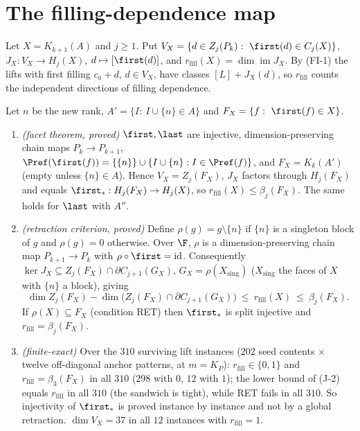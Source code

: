 \section{The filling-dependence map}\label{sec:JX}
\begin{definition}\label{def:JX}
Let $X=K_{k+1}(A)$ and $j\ge1$. Put $V_X=\{d\in Z_j(P_k):\ \first(d)\in C_j(X)\}$, $J_X:V_X\to H_j(X)$, $d\mapsto[\first(d)]$, and $r_{\mathrm{fill}}(X)=\dim\operatorname{im}J_X$. By (FI-1) the lifts with first filling $c_a+d$, $d\in V_X$, have classes $[L]+J_X(d)$, so $r_{\mathrm{fill}}$ counts the independent directions of filling dependence.
\end{definition}
\begin{theorem}\label{thm:JX}
Let $n$ be the new rank, $A'=\{I:\ I\cup\{n\}\in A\}$ and $F_X=\{f:\ \first(f)\in X\}$.
\begin{enumerate}[label=(J-\arabic*)]
\item \emph{(facet theorem, proved)} $\first,\last$ are injective, dimension-preserving chain maps $P_k\to P_{k+1}$, $\Pref(\first(f))=\{\{n\}\}\cup\{I\cup\{n\}:I\in\Pref(f)\}$, and $F_X=K_k(A')$ (empty unless $\{n\}\in A$). Hence $V_X=Z_j(F_X)$, $J_X$ factors through $H_j(F_X)$ and equals $\first_\ast:H_j(F_X)\to H_j(X)$, so $r_{\mathrm{fill}}(X)\le\beta_j(F_X)$. The same holds for $\last$ with $A''$.
\item \emph{(retraction criterion, proved)} Define $\rho(g)=g\setminus\{n\}$ if $\{n\}$ is a singleton block of $g$ and $\rho(g)=0$ otherwise. Over $\F$, $\rho$ is a dimension-preserving chain map $P_{k+1}\to P_k$ with $\rho\circ\first=\mathrm{id}$. Consequently $\ker J_X\subseteq Z_j(F_X)\cap\partial C_{j+1}(G_X)$, $G_X=\rho(X_{\mathrm{sing}})$ ($X_{\mathrm{sing}}$ the faces of $X$ with $\{n\}$ a block), giving
\[
\dim Z_j(F_X)-\dim\bigl(Z_j(F_X)\cap\partial C_{j+1}(G_X)\bigr)\ \le\ r_{\mathrm{fill}}(X)\ \le\ \beta_j(F_X).
\]
If $\rho(X)\subseteq F_X$ (condition RET) then $\first_\ast$ is split injective and $r_{\mathrm{fill}}=\beta_j(F_X)$.
\item \emph{(finite-exact)} Over the $310$ surviving lift instances ($202$ seed contents $\times$ twelve off-diagonal anchor patterns, at $m=K_P$): $r_{\mathrm{fill}}\in\{0,1\}$ and $r_{\mathrm{fill}}=\beta_3(F_X)$ in all $310$ ($298$ with $0$, $12$ with $1$); the lower bound of (J-2) equals $r_{\mathrm{fill}}$ in all $310$ (the sandwich is tight), while RET fails in all $310$. So injectivity of $\first_\ast$ is proved instance by instance and not by a global retraction. $\dim V_X=37$ in all $12$ instances with $r_{\mathrm{fill}}=1$.

\end{enumerate}
\end{theorem}
